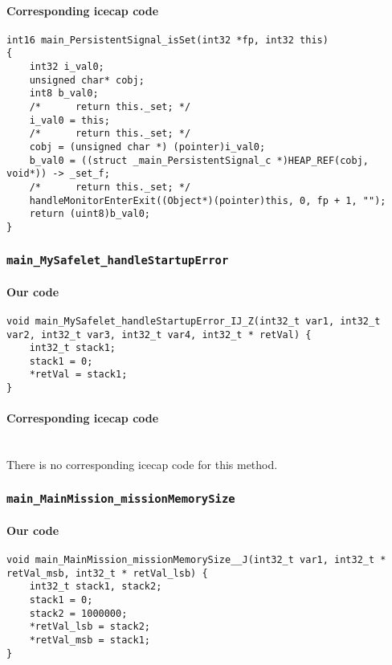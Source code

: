 \paragraph{Corresponding icecap code}\hfill
\begin{lstlisting}[firstnumber=54581]
int16 main_PersistentSignal_isSet(int32 *fp, int32 this)
{
	int32 i_val0;
	unsigned char* cobj;
	int8 b_val0;
	/*		return this._set; */
	i_val0 = this;
	/*		return this._set; */
	cobj = (unsigned char *) (pointer)i_val0;
	b_val0 = ((struct _main_PersistentSignal_c *)HEAP_REF(cobj, void*)) -> _set_f;
	/*		return this._set; */
	handleMonitorEnterExit((Object*)(pointer)this, 0, fp + 1, "");
	return (uint8)b_val0;
}
\end{lstlisting}

\subsubsection{\texttt{main\_MySafelet\_handleStartupError}}

\paragraph{Our code}\hfill
\begin{lstlisting}[firstnumber=1177]
void main_MySafelet_handleStartupError_IJ_Z(int32_t var1, int32_t var2, int32_t var3, int32_t var4, int32_t * retVal) {
	int32_t stack1;
	stack1 = 0;
	*retVal = stack1;
}
\end{lstlisting}

\paragraph{Corresponding icecap code}\hfill\\
There is no corresponding icecap code for this method.

\subsubsection{\texttt{main\_MainMission\_missionMemorySize}}

\paragraph{Our code}\hfill
\begin{lstlisting}[firstnumber=1256]
void main_MainMission_missionMemorySize__J(int32_t var1, int32_t * retVal_msb, int32_t * retVal_lsb) {
	int32_t stack1, stack2;
	stack1 = 0;
	stack2 = 1000000;
	*retVal_lsb = stack2;
	*retVal_msb = stack1;
}
\end{lstlisting}

